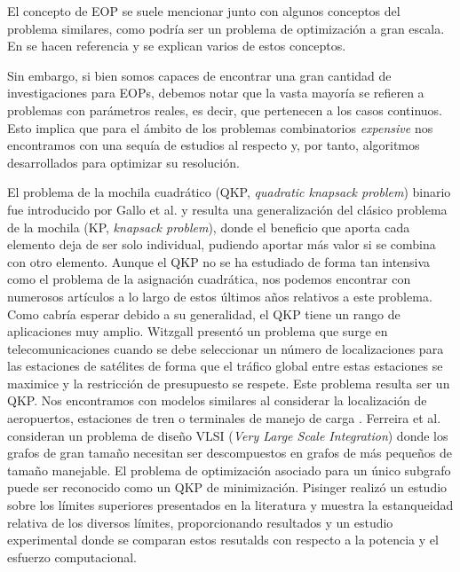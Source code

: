 El concepto de EOP se suele mencionar junto con algunos conceptos del problema similares, como podría ser un problema de optimización a gran escala. 
En \parencite{liEvolutionaryComputationExpensive2022} se hacen referencia y se explican varios de estos conceptos. 


Sin embargo, si bien somos capaces de encontrar una gran cantidad de investigaciones para EOPs, debemos notar que la vasta mayoría se refieren a problemas con parámetros reales, es decir, que pertenecen a los casos continuos. 
Esto implica que para el ámbito de los problemas combinatorios \textit{expensive} nos encontramos con una sequía de estudios al respecto y, por tanto, algoritmos desarrollados para optimizar su resolución. 


El problema de la mochila cuadrático (QKP, \textit{quadratic knapsack problem}) binario fue introducido por Gallo et al. \parencite{galloQuadraticKnapsackProblems1980} y resulta una generalización del clásico problema de la mochila (KP, \textit{knapsack problem}), donde el beneficio que aporta cada elemento deja de ser solo individual, pudiendo aportar más valor si se combina con otro elemento. 
Aunque el QKP no se ha estudiado de forma tan intensiva como el problema de la asignación cuadrática, nos podemos encontrar con numerosos artículos a lo largo de estos últimos años relativos a este problema. 
Como cabría esperar debido a su generalidad, el QKP tiene un rango de aplicaciones muy amplio. 
Witzgall \parencite{witzgallMathematicalMethodsSite1975} presentó un problema que surge en telecomunicaciones cuando se debe seleccionar un número de localizaciones para las estaciones de satélites de forma que el tráfico global entre estas estaciones se maximice y la restricción de presupuesto se respete. 
Este problema resulta ser un QKP. 
Nos encontramos con modelos similares al considerar la localización de aeropuertos, estaciones de tren o terminales de manejo de carga \parencite{rhysSelectionProblemShared1970}. 
Ferreira et al. \parencite{ferreiraFormulationsValidInequalities1996} consideran un problema de diseño VLSI (\textit{Very Large Scale Integration}) donde los grafos de gran tamaño necesitan ser descompuestos en grafos de más pequeños de tamaño manejable. 
El problema de optimización asociado para un único subgrafo puede ser reconocido como un QKP de minimización. 
Pisinger \parencite{pisingerQuadraticKnapsackProblem2007} realizó un estudio sobre los límites superiores presentados en la literatura y muestra la estanqueidad relativa de los diversos límites, proporcionando resultados y un estudio experimental donde se comparan estos resutalds con respecto a la potencia y el esfuerzo computacional. 

